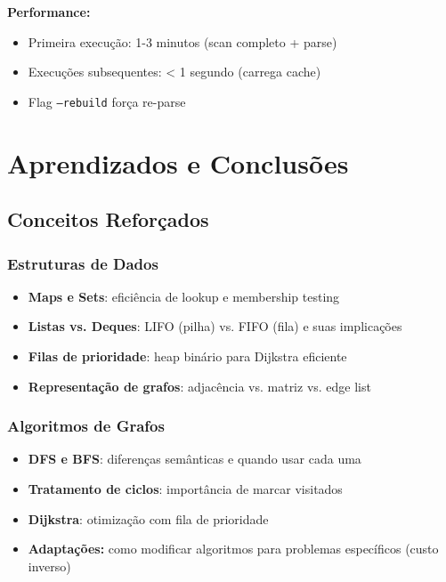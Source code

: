 \documentclass[12pt,openright,twoside,a4paper,english,brazilian,hidelinks]{abntex2}
\begin{document}
    \textbf{Performance:}

    \begin{itemize}
        \item Primeira execução: 1-3 minutos (scan completo + parse)
        \item Execuções subsequentes: < 1 segundo (carrega cache)
        \item Flag \texttt{--rebuild} força re-parse
    \end{itemize}


    \chapter{Aprendizados e Conclusões}

    \section{Conceitos Reforçados}

    \subsection{Estruturas de Dados}

    \begin{itemize}
        \item \textbf{Maps e Sets}: eficiência de lookup e membership testing
        \item \textbf{Listas vs. Deques}: LIFO (pilha) vs. FIFO (fila) e suas implicações
        \item \textbf{Filas de prioridade}: heap binário para Dijkstra eficiente
        \item \textbf{Representação de grafos}: adjacência vs. matriz vs. edge list
    \end{itemize}

    \subsection{Algoritmos de Grafos}

    \begin{itemize}
        \item \textbf{DFS e BFS}: diferenças semânticas e quando usar cada uma
        \item \textbf{Tratamento de ciclos}: importância de marcar visitados
        \item \textbf{Dijkstra}: otimização com fila de prioridade
        \item \textbf{Adaptações:} como modificar algoritmos para problemas específicos (custo inverso)
    \end{itemize}
\end{document}
